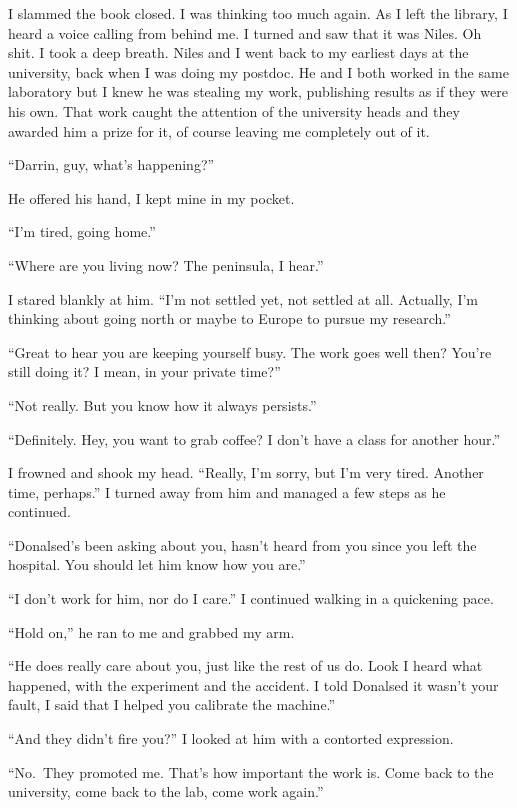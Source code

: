 \documentclass[
]{article}
\begin{document}
I slammed the book closed. I was thinking too much again. As I left the
library, I heard a voice calling from behind me. I turned and saw that
it was Niles. Oh shit. I took a deep breath. Niles and I went back to my
earliest days at the university, back when I was doing my postdoc. He
and I both worked in the same laboratory but I knew he was stealing my
work, publishing results as if they were his own. That work caught the
attention of the university heads and they awarded him a prize for it,
of course leaving me completely out of it.

``Darrin, guy, what's happening?''

He offered his hand, I kept mine in my pocket.

``I'm tired, going home.''

``Where are you living now? The peninsula, I hear.''

I stared blankly at him. ``I'm not settled yet, not settled at all.
Actually, I'm thinking about going north or maybe to Europe to pursue my
research.''

``Great to hear you are keeping yourself busy. The work goes well then?
You're still doing it? I mean, in your private time?''

``Not really. But you know how it always persists.''

``Definitely. Hey, you want to grab coffee? I don't have a class for
another hour.''

I frowned and shook my head. ``Really, I'm sorry, but I'm very tired.
Another time, perhaps.'' I turned away from him and managed a few steps
as he continued.

``Donalsed's been asking about you, hasn't heard from you since you left
the hospital. You should let him know how you are.''

``I don't work for him, nor do I care.'' I continued walking in a
quickening pace.

``Hold on,'' he ran to me and grabbed my arm.

``He does really care about you, just like the rest of us do. Look I
heard what happened, with the experiment and the accident. I told
Donalsed it wasn't your fault, I said that I helped you calibrate the
machine.''

``And they didn't fire you?'' I looked at him with a contorted
expression.

``No.~They promoted me. That's how important the work is. Come back to
the university, come back to the lab, come work again.''
\end{document}
